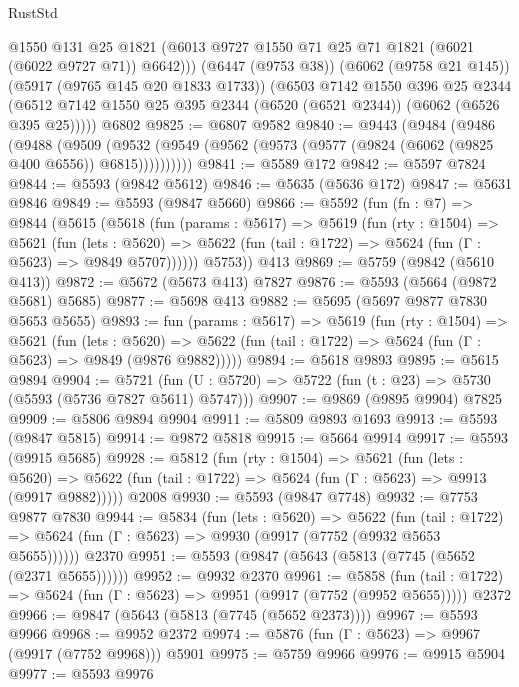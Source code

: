 \begin{lexlean}{RustStd}
\begin{coremodule}
          @1550
          @131
          @25
          @1821
          (@6013 @9727 @1550 @71 @25 @71 @1821 (@6021 (@6022 @9727 @71)) @6642)))
      (@6447 (@9753 @38))
      (@6062 (@9758 @21 @145))
      (@5917 (@9765 @145 @20 @1833 @1733))
      (@6503
        @7142
        @1550
        @396
        @25
        @2344
        (@6512 @7142 @1550 @25 @395 @2344 (@6520 (@6521 @2344)) (@6062 (@6526 @395 @25)))))
    @6802
@9825 := @6807 @9582
@9840 := @9443
    (@9484
      (@9486
        (@9488
          (@9509
            (@9532 (@9549 (@9562 (@9573 (@9577 (@9824 (@6062 (@9825 @400 @6556)) @6815))))))))))
@9841 := @5589 @172
@9842 := @5597 @7824
@9844 := @5593 (@9842 @5612)
@9846 := @5635 (@5636 @172)
@9847 := @5631 @9846
@9849 := @5593 (@9847 @5660)
@9866 := @5592
    (fun (fn : @7) =>
    @9844
      (@5615
        (@5618
          (fun (params : @5617) =>
          @5619
            (fun (rty : @1504) =>
            @5621
              (fun (lets : @5620) =>
              @5622 (fun (tail : @1722) => @5624 (fun (Γ : @5623) => @9849 @5707))))))
        @5753))
    @413
@9869 := @5759 (@9842 (@5610 @413))
@9872 := @5672 (@5673 @413) @7827
@9876 := @5593 (@5664 (@9872 @5681) @5685)
@9877 := @5698 @413
@9882 := @5695 (@5697 @9877 @7830 @5653 @5655)
@9893 := fun (params : @5617) =>
  @5619
    (fun (rty : @1504) =>
    @5621
      (fun (lets : @5620) =>
      @5622 (fun (tail : @1722) => @5624 (fun (Γ : @5623) => @9849 (@9876 @9882)))))
@9894 := @5618 @9893
@9895 := @5615 @9894
@9904 := @5721 (fun (U : @5720) => @5722 (fun (t : @23) => @5730 (@5593 (@5736 @7827 @5611) @5747)))
@9907 := @9869 (@9895 @9904) @7825
@9909 := @5806 @9894 @9904
@9911 := @5809 @9893 @1693
@9913 := @5593 (@9847 @5815)
@9914 := @9872 @5818
@9915 := @5664 @9914
@9917 := @5593 (@9915 @5685)
@9928 := @5812
    (fun (rty : @1504) =>
    @5621
      (fun (lets : @5620) =>
      @5622 (fun (tail : @1722) => @5624 (fun (Γ : @5623) => @9913 (@9917 @9882)))))
    @2008
@9930 := @5593 (@9847 @7748)
@9932 := @7753 @9877 @7830
@9944 := @5834
    (fun (lets : @5620) =>
    @5622
      (fun (tail : @1722) => @5624 (fun (Γ : @5623) => @9930 (@9917 (@7752 (@9932 @5653 @5655))))))
    @2370
@9951 := @5593 (@9847 (@5643 (@5813 (@7745 (@5652 (@2371 @5655))))))
@9952 := @9932 @2370
@9961 := @5858
    (fun (tail : @1722) => @5624 (fun (Γ : @5623) => @9951 (@9917 (@7752 (@9952 @5655)))))
    @2372
@9966 := @9847 (@5643 (@5813 (@7745 (@5652 @2373))))
@9967 := @5593 @9966
@9968 := @9952 @2372
@9974 := @5876 (fun (Γ : @5623) => @9967 (@9917 (@7752 @9968))) @5901
@9975 := @5759 @9966
@9976 := @9915 @5904
@9977 := @5593 @9976

\end{coremodule}
\end{lexlean}
